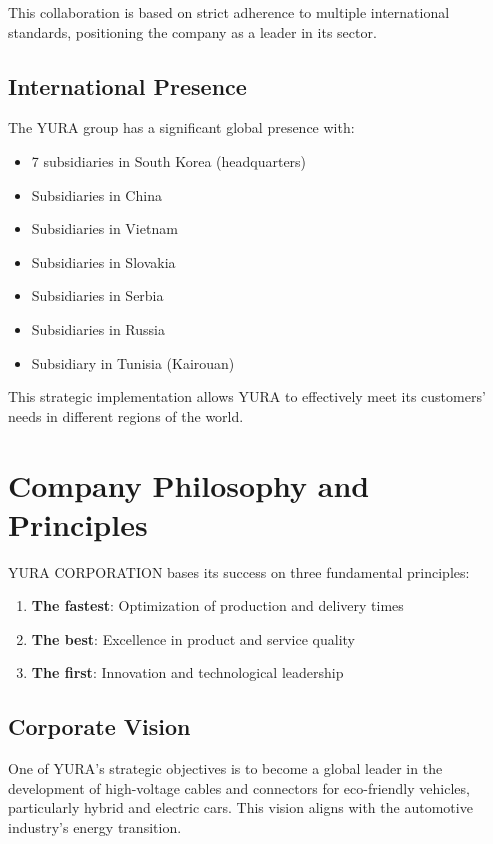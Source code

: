 This collaboration is based on strict adherence to multiple international standards, positioning the company as a leader in its sector.

\subsection{International Presence}

The YURA group has a significant global presence with:
\begin{itemize}
    \item 7 subsidiaries in South Korea (headquarters)
    \item Subsidiaries in China
    \item Subsidiaries in Vietnam
    \item Subsidiaries in Slovakia
    \item Subsidiaries in Serbia
    \item Subsidiaries in Russia
    \item Subsidiary in Tunisia (Kairouan)
\end{itemize}

This strategic implementation allows YURA to effectively meet its customers' needs in different regions of the world.

\section{Company Philosophy and Principles}

YURA CORPORATION bases its success on three fundamental principles:

\begin{enumerate}
    \item \textbf{The fastest}: Optimization of production and delivery times
    \item \textbf{The best}: Excellence in product and service quality
    \item \textbf{The first}: Innovation and technological leadership
\end{enumerate}

\subsection{Corporate Vision}

One of YURA's strategic objectives is to become a global leader in the development of high-voltage cables and connectors for eco-friendly vehicles, particularly hybrid and electric cars. This vision aligns with the automotive industry's energy transition.

